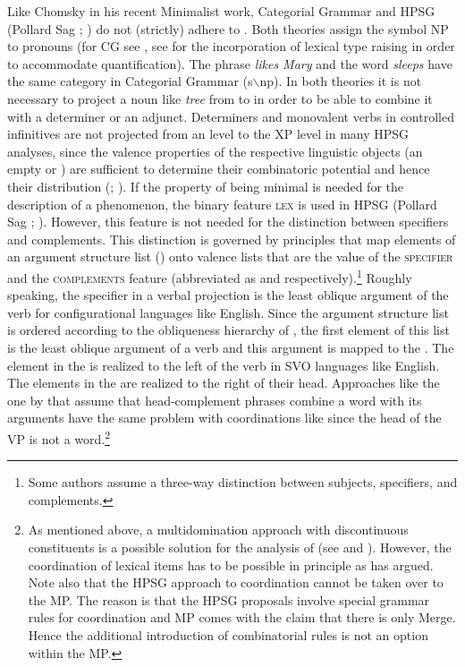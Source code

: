 \addlines
Like Chomsky in his recent Minimalist work, Categorial Grammar \citep{Ajdukiewicz35a-u} and HPSG
(Pollard \biband Sag \citeyear{ps}; \citeyear[--40]{ps2}) do not (strictly) adhere to
\xbart. Both theories assign the symbol NP to pronouns (for CG see , see
 for the incorporation of lexical type raising in order to accommodate
quantification). The phrase \emph{likes Mary} and the word \emph{sleeps} have the same category in Categorial Grammar (s$\backslash$np). In both theories it is not
necessary to project a noun like \emph{tree} from \nnull to \nbar in order to be able to combine it
with a determiner or an adjunct. Determiners and monovalent verbs in controlled infinitives are
not projected from an \xzero level to the XP level in many HPSG analyses, since the valence
properties of the respective linguistic objects (an empty \subcat or \compsl) are sufficient to
determine their combinatoric potential and hence their distribution (\citealp{Mueller96a};
\citealp{Mueller99a}). If the property of being minimal is needed for the description of a 
phenomenon, the binary feature \textsc{lex} is used in HPSG (Pollard \biband Sag \citeyear[]{ps};
\citeyear[]{ps2}). However, this feature is not needed for the distinction between
specifiers and complements. This distinction is governed by principles that map elements of an
argument structure list (\argst) onto valence lists that are the value of the \textsc{specifier} and
the \textsc{complements} feature (abbreviated as \spr and \comps respectively).\footnote{%
  Some authors assume a three-way distinction between subjects, specifiers, and complements.
} Roughly speaking, the specifier in a verbal projection is the least oblique argument of the verb for
configurational languages like English. Since the argument structure list is ordered according to
the obliqueness hierarchy of \citet{KC77a}, the first element of this list is the least oblique
argument of a verb and this argument is mapped to the \sprl. The element in the \sprl is realized to the left of the
verb in SVO languages like English. The elements in the \compsl are realized to the right of their
head. Approaches like the one by \citet[, 364]{GSag2000a-u} that assume that
head-complement phrases combine a word with its arguments have the same problem with coordinations
like  since the head of the VP is not a word.\footnote{%
  As mentioned above, a multidomination approach with discontinuous constituents is a possible
  solution for the analysis of   (see
  \citealp{Crysmann2000a} and \citealp{BS2004a}). However, the coordination of lexical items has to be possible in
  principle as \citet{Abeille2006a} has argued. Note also that the HPSG approach to coordination
  cannot be taken over to the MP. The reason is that the HPSG proposals involve special grammar
  rules for coordination and MP comes with the claim that there is only Merge. Hence the additional
  introduction of combinatorial rules is not an option within the MP.
} 
